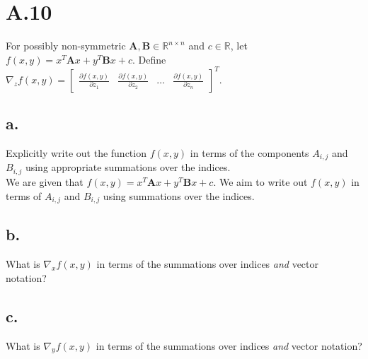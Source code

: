 \documentclass{article}
\newcommand{\field}[1]{\mathbb{#1}}
\newcommand{\1}{\mathbf{1}}
\newcommand{\R}{\field{R}} %
\newcommand{\mat}[1]{\boldsymbol{#1}} %
\begin{document}
\section*{A.10}
{\Large 

For possibly non-symmetric $\mat{A}, \mat{B} \in \R^{n \times n}$ and $c \in \R$, let $f(x, y) = x^T \mat{A} x + y^T \mat{B} x + c$. Define $\nabla_z f(x,y) = \begin{bmatrix} \frac{\partial f(x,y)}{\partial z_1} & \frac{\partial f(x,y)}{\partial z_2} & \dots & \frac{\partial f(x,y)}{\partial z_n} \end{bmatrix}^T$.  

\subsection*{a.}
Explicitly write out the function $f(x, y)$ in terms of the components $A_{i,j}$ and $B_{i,j}$ using appropriate summations over the indices. \\ 

We are given that $f(x, y) = x^T \mat{A} x + y^T \mat{B} x + c$. We aim to write out $f(x, y)$ in terms of $A_{i,j}$ and $B_{i,j}$ using summations over the indices. 

\subsection*{b.}
What is $\nabla_x f(x,y)$ in terms of the summations over indices \emph{and} vector notation?

\subsection*{c.}
What is $\nabla_y f(x,y)$ in terms of the summations over indices \emph{and} vector notation?

}
\end{document}
